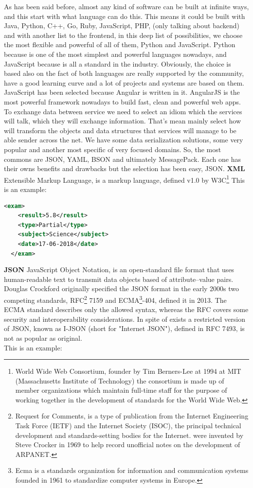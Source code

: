 As has been said before, almost any kind of software can be built at infinite
ways, and this start with what language can do this. This means it could be
built with Java, Python, C++, Go, Ruby, JavaScript, PHP,  (only talking about
backend) and with another list to the frontend, in this deep list of possibilities,
we choose the most flexible and powerful of all of them, Python and JavaScript.
\intro
Python because is one of the most simplest and powerful languages nowadays, and
JavaScript because is all a standard in the industry. Obviously, the choice is
based also on the fact of both languages are really supported by the community, have a
good learning curve and a lot of projects and systems are based on them.
\intro
JavaScript has been selected because Angular is written in it. AngularJS is the
most powerful framework nowadays to build fast, clean and powerful web apps.
\intro
To exchange data between service we need to select an idiom which the services
will talk, which they will exchange information. That's mean mainly select how
will transform the objects and data structures that services will manage to be able
sender across the net.
\intro
We have some data serialization solutions, some very popular and another most
specific of very focused domains. So, the most commons are JSON, YAML,
BSON and ultimately MessagePack. Each one has their owns benefits and drawbacks but
the selection has been easy, JSON.
\intro
\textbf{XML}
\intro
Extensible Markup Language, is a markup language, defined v1.0 by
W3C\footnote{World Wide Web Consortium, founder by Tim Berners-Lee at 1994 at MIT
(Massachusetts Institute of Technology) the consortium is made up of member
organizations which maintain full-time staff for the purpose of working together
in the development of standards for the World Wide Web.} This is an example:

\begin{lstlisting}[language=xml,frame=none,numbers=none]
  <exam>
    <result>5.8</result>
    <type>Partial</type>
    <subject>Science</subject>
    <date>17-06-2018</date>
  </exam>
\end{lstlisting}


\noindent \textbf{JSON}
\intro
JavaScript Object Notation, is an open-standard file format that uses
human-readable text to transmit data objects based of attribute–value pairs.
Douglas Crockford originally specified the JSON format in the early 2000s
two competing standards, RFC\footnote{ Request for Comments, is a type of
publication from the Internet Engineering Task Force (IETF) and the Internet
Society (ISOC), the principal technical development and standards-setting bodies
for the Internet. were invented by Steve Crocker in 1969 to help record
unofficial notes on the development of ARPANET.} 7159 and ECMA\footnote{Ecma is a
standards organization for information and communication systems founded in 1961
to standardize computer systems in Europe.}-404, defined it in 2013.
The ECMA standard describes only the allowed syntax, whereas the RFC covers some
 security and interoperability considerations.
\intro
In spite of exists a restricted version of JSON, known as I-JSON (short for "Internet JSON"),
defined in RFC 7493, is not as popular as original.
\\This is an example:

